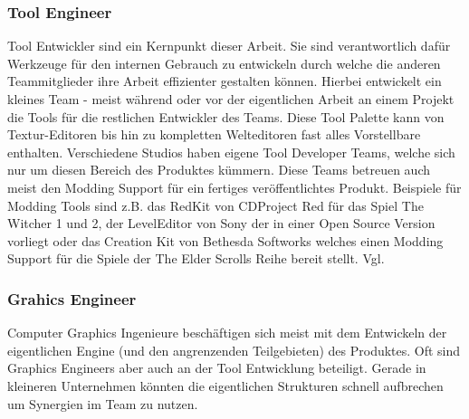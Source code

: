 \documentclass[pagesize, paper=a4, fontsize=12pt, titlepage=true, headings=small, headnosepline, abstractoff, liststotoc, nochapterprefix, plainheadsepline, twoside]{scrreprt}
\begin{document}
\subsubsection{Tool Engineer}
Tool Entwickler sind ein Kernpunkt dieser Arbeit. Sie sind verantwortlich dafür Werkzeuge für den internen Gebrauch zu entwickeln durch welche die anderen Teammitglieder ihre Arbeit effizienter gestalten können. Hierbei entwickelt ein kleines Team - meist während oder vor der eigentlichen Arbeit an einem Projekt die Tools für die restlichen Entwickler des Teams. Diese Tool Palette kann von Textur-Editoren bis hin zu kompletten Welteditoren fast alles Vorstellbare enthalten. Verschiedene Studios haben eigene Tool Developer Teams, welche sich nur um diesen Bereich des Produktes kümmern. Diese Teams betreuen auch meist den Modding Support für ein fertiges veröffentlichtes Produkt. Beispiele für Modding Tools sind z.B. das RedKit von CDProject Red für das Spiel The Witcher 1 und 2, der LevelEditor von Sony der in einer Open Source Version vorliegt oder das Creation Kit von Bethesda Softworks welches einen Modding Support für die Spiele der The Elder Scrolls Reihe bereit stellt. Vgl. \parencite[S. 27 ]{Chandler2006}

\subsubsection{Grahics Engineer}
Computer Graphics Ingenieure beschäftigen sich meist mit dem Entwickeln der eigentlichen Engine (und den angrenzenden Teilgebieten) des Produktes. Oft sind Graphics Engineers aber auch an der Tool Entwicklung beteiligt. Gerade in kleineren Unternehmen könnten die eigentlichen Strukturen schnell aufbrechen um Synergien im Team zu nutzen. \parencite[S. 27 ]{Chandler2006}
\end{document}
